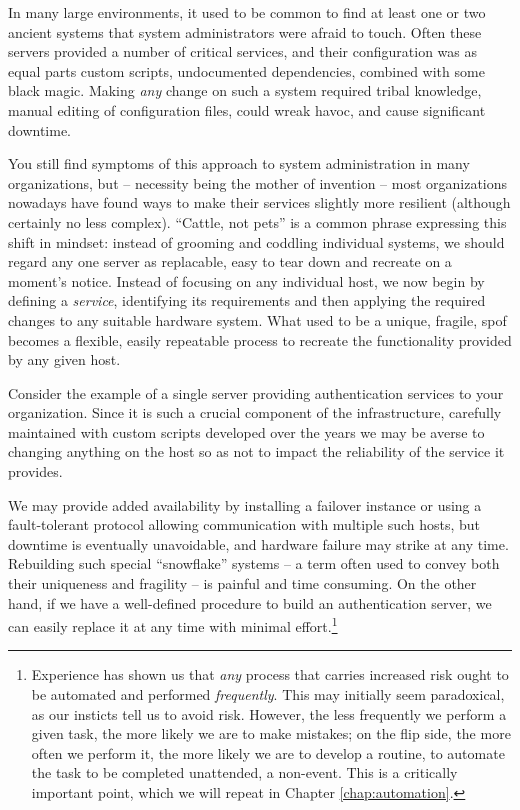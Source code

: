 In many large environments, it used to be common to
find at least one or two ancient systems that system
administrators were afraid to touch.  Often these
servers provided a number of critical services, and
their configuration was as equal parts custom scripts,
undocumented dependencies, combined with some black
magic.  Making {\em any} change on such a system
required tribal knowledge, manual editing of
configuration files, could wreak havoc, and cause
significant downtime.

You still find symptoms of this approach to system
administration in many organizations, but -- necessity
being the mother of invention -- most organizations
nowadays have found ways to make their services
slightly more resilient (although certainly no less
complex).  ``Cattle, not pets'' is a common phrase
expressing this shift in mindset:  instead of grooming
and coddling individual systems, we should regard any
one server as replacable, easy to tear down and
recreate on a moment's notice.  Instead of focusing on
any individual host, we now begin by defining a {\em
service}, identifying its requirements and then
applying the required changes to any suitable hardware
system.  What used to be a unique, fragile, \gls{spof}
becomes a flexible, easily repeatable process to
recreate the functionality provided by any given host.

Consider the example of a single server providing
authentication services to your organization.  Since
it is such a crucial component of the infrastructure,
carefully maintained with custom scripts developed
over the years we may be averse to changing anything
on the host so as not to impact the reliability of the
service it provides.

We may provide added availability by installing a
failover instance or using a fault-tolerant protocol
allowing communication with multiple such hosts, but
downtime is eventually unavoidable, and hardware
failure may strike at any time.  Rebuilding such
special ``snowflake'' systems -- a term often used to
convey both their uniqueness and fragility -- is
painful and time consuming.  On the other hand, if we
have a well-defined procedure to build an
authentication server, we can easily replace it at
any time with minimal effort.\footnote{Experience has
shown us that {\em any} process that carries increased
risk ought to be automated and performed {\em
frequently}.  This may initially seem paradoxical, as
our insticts tell us to avoid risk.  However, the less
frequently we perform a given task, the more likely we
are to make mistakes; on the flip side, the more often
we perform it, the more likely we are to develop a
routine, to automate the task to be completed
unattended, a non-event.  This is a critically
important point, which we will repeat in Chapter
\ref{chap:automation}.} \\

